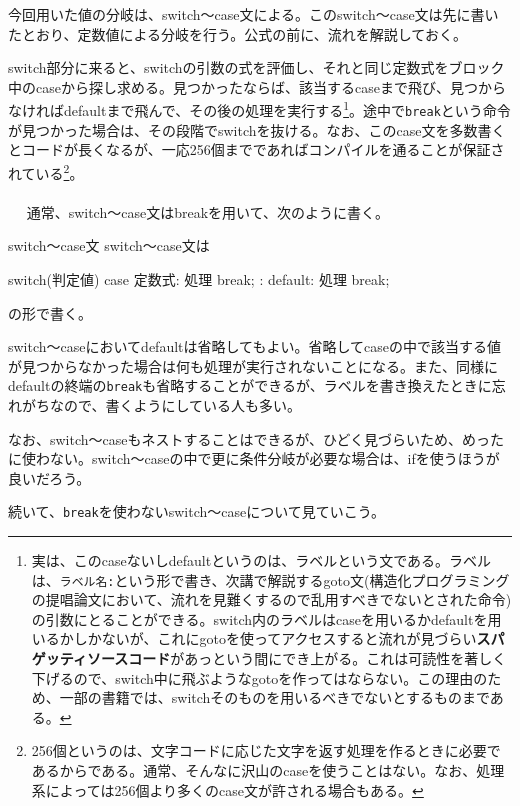 今回用いた値の分岐は、switch〜case文による。このswitch〜case文は先に書いたとおり、定数値による分岐を行う。公式の前に、流れを解説しておく。

switch部分に来ると、switchの引数の式を評価し、それと同じ定数式をブロック中のcaseから探し求める。見つかったならば、該当するcaseまで飛び、見つからなければdefaultまで飛んで、その後の処理を実行する\footnote{実は、このcaseないしdefaultというのは、ラベルという文である。ラベルは、\verb|ラベル名:|という形で書き、次講で解説するgoto文(構造化プログラミングの提唱論文において、流れを見難くするので乱用すべきでないとされた命令)の引数にとることができる。switch内のラベルはcaseを用いるかdefaultを用いるかしかないが、これにgotoを使ってアクセスすると流れが見づらい\textbf{スパゲッティソースコード}があっという間にでき上がる。これは可読性を著しく下げるので、switch中に飛ぶようなgotoを作ってはならない。この理由のため、一部の書籍では、switchそのものを用いるべきでないとするものまである。}。途中で\verb|break|という命令が見つかった場合は、その段階でswitchを抜ける。なお、このcase文を多数書くとコードが長くなるが、一応256個までであればコンパイルを通ることが保証されている\footnote{256個というのは、文字コードに応じた文字を返す処理を作るときに必要であるからである。通常、そんなに沢山のcaseを使うことはない。なお、処理系によっては256個より多くのcase文が許される場合もある。}。
\\ \\　
通常、switch〜case文はbreakを用いて、次のように書く。
\begin{itembox}[l]{switch〜case文}
switch〜case文は
\begin{code}
switch(判定値){
  case 定数式:
    処理
    break;
     :
  default:
    処理
    break;
}
\end{code}
の形で書く。
\end{itembox}
switch〜caseにおいてdefaultは省略してもよい。省略してcaseの中で該当する値が見つからなかった場合は何も処理が実行されないことになる。また、同様にdefaultの終端の\verb|break|も省略することができるが、ラベルを書き換えたときに忘れがちなので、書くようにしている人も多い。

なお、switch〜caseもネストすることはできるが、ひどく見づらいため、めったに使わない。switch〜caseの中で更に条件分岐が必要な場合は、ifを使うほうが良いだろう。

続いて、\verb|break|を使わないswitch〜caseについて見ていこう。

